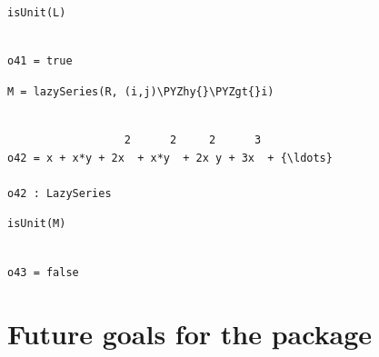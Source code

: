 \documentclass[11pt]{article}
\makeatletter
\def\PYZgt{\char`\>}
\def\PYZhy{\char`\-}
\newcommand{\boxspacing}{\kern\kvtcb@left@rule\kern\kvtcb@boxsep}
\newcommand{\prompt}[4]{
        {\ttfamily\llap{{\color{#2}[#3]:\hspace{3pt}#4}}\vspace{-\baselineskip}}
    }
\makeatother
\begin{document}
    \begin{tcolorbox}[breakable, size=fbox, boxrule=1pt, pad at break*=1mm,colback=cellbackground, colframe=cellborder]
\prompt{In}{incolor}{41}{\boxspacing}
\begin{Verbatim}[commandchars=\\\{\}]
isUnit(L)
\end{Verbatim}
\end{tcolorbox}

    \begin{Verbatim}[commandchars=\\\{\}]

o41 = true
    \end{Verbatim}

    \begin{tcolorbox}[breakable, size=fbox, boxrule=1pt, pad at break*=1mm,colback=cellbackground, colframe=cellborder]
\prompt{In}{incolor}{42}{\boxspacing}
\begin{Verbatim}[commandchars=\\\{\}]
M = lazySeries(R, (i,j)\PYZhy{}\PYZgt{}i)
\end{Verbatim}
\end{tcolorbox}

    \begin{Verbatim}[commandchars=\\\{\}]

                  2      2     2      3
o42 = x + x*y + 2x  + x*y  + 2x y + 3x  + {\ldots}

o42 : LazySeries
    \end{Verbatim}

    \begin{tcolorbox}[breakable, size=fbox, boxrule=1pt, pad at break*=1mm,colback=cellbackground, colframe=cellborder]
\prompt{In}{incolor}{43}{\boxspacing}
\begin{Verbatim}[commandchars=\\\{\}]
isUnit(M)
\end{Verbatim}
\end{tcolorbox}

    \begin{Verbatim}[commandchars=\\\{\}]

o43 = false
    \end{Verbatim}

    \hypertarget{future-goals-for-the-package}{%
\section{Future goals for the
package}\label{future-goals-for-the-package}}
\end{document}
